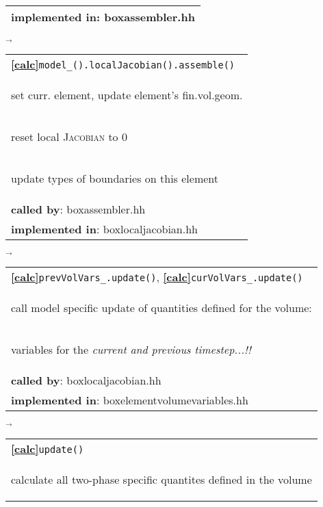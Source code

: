 \begin{landscape}
{\begin{tabular}{|l|}
      \textbf{implemented in}: boxassembler.hh\\  
      \hline
     \end{tabular}
\nextline
    {\scriptsize$\overrightarrow{
        }$}
     \begin{tabular}{|l|}
      \hline
     \textbf{\textcircled{\ref{calc}}}\verb+model_().localJacobian().assemble()+ \\
     \begin{scriptsize}set curr. element, update element's fin.vol.geom.\end{scriptsize}\\
     \begin{scriptsize}reset local \textsc{Jacobian} to 0\end{scriptsize}\\
     \begin{scriptsize}update types of boundaries on this element\end{scriptsize}\\
      \textbf{called by}: boxassembler.hh\\
      \textbf{implemented in}:  boxlocaljacobian.hh\\  
	\hline
  \end{tabular}
    $\overrightarrow{
    }$
    \begin{tabular}{|l|}
      \hline
      \textbf{\textcircled{\ref{calc}}}\verb+prevVolVars_.update()+, \textbf{\textcircled{\ref{calc}}}\verb+curVolVars_.update()+ \\
    \begin{scriptsize}call model specific update of quantities defined for the volume:\end{scriptsize}\\
    \begin{scriptsize}variables for the \emph{current and previous timestep...!!}\end{scriptsize}\\
      \textbf{called by}: boxlocaljacobian.hh\\
      \textbf{implemented in}: boxelementvolumevariables.hh\\  
	\hline
  \end{tabular}
\nextline
    $\overrightarrow{
    }$
    \begin{tabular}{||l||}
      \hline\hline
      \textbf{\textcircled{\ref{calc}}}\verb+update()+ \\
    \begin{scriptsize}calculate all two-phase specific quantites defined in the volume\end{scriptsize}\\

\end{tabular}}
\end{landscape}
